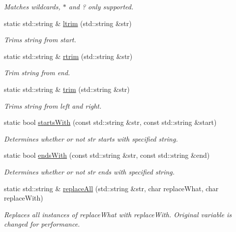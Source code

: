 \begin{DoxyCompactItemize}
\begin{DoxyCompactList}\small\item\em Matches wildcards, \textquotesingle{}$\ast$\textquotesingle{} and \textquotesingle{}?\textquotesingle{} only supported. \end{DoxyCompactList}\item 
static std\+::string \& \hyperlink{classel_1_1base_1_1utils_1_1Str_a64b7a841f04ed916ed8d234b8508703e}{ltrim} (std\+::string \&str)
\begin{DoxyCompactList}\small\item\em Trims string from start. \end{DoxyCompactList}\item 
static std\+::string \& \hyperlink{classel_1_1base_1_1utils_1_1Str_a9202797763e10861c4fa84ffd40198bb}{rtrim} (std\+::string \&str)
\begin{DoxyCompactList}\small\item\em Trim string from end. \end{DoxyCompactList}\item 
static std\+::string \& \hyperlink{classel_1_1base_1_1utils_1_1Str_aba0bc132c410fd3c1e128d1038e996ba}{trim} (std\+::string \&str)
\begin{DoxyCompactList}\small\item\em Trims string from left and right. \end{DoxyCompactList}\item 
static bool \hyperlink{classel_1_1base_1_1utils_1_1Str_acf80221cec72da701ef50995a61ab91f}{starts\+With} (const std\+::string \&str, const std\+::string \&start)
\begin{DoxyCompactList}\small\item\em Determines whether or not str starts with specified string. \end{DoxyCompactList}\item 
static bool \hyperlink{classel_1_1base_1_1utils_1_1Str_a5bcf5f6cc41a7ed683be115148579561}{ends\+With} (const std\+::string \&str, const std\+::string \&end)
\begin{DoxyCompactList}\small\item\em Determines whether or not str ends with specified string. \end{DoxyCompactList}\item 
static std\+::string \& \hyperlink{classel_1_1base_1_1utils_1_1Str_aa07bfda259ed194120b371401734ae86}{replace\+All} (std\+::string \&str, char replace\+What, char replace\+With)
\begin{DoxyCompactList}\small\item\em Replaces all instances of replace\+What with \textquotesingle{}replace\+With\textquotesingle{}. Original variable is changed for performance. \end{DoxyCompactList}\item 

\end{DoxyCompactItemize}
